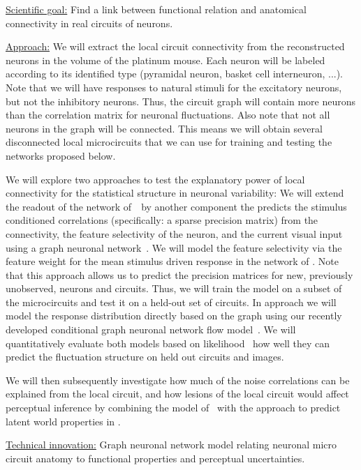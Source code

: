\documentclass[COG,11pt]{ercgrant}
\begin{document}
\underline{Scientific goal:} Find a link between functional relation and anatomical connectivity in real circuits of neurons. 

\underline{Approach:} We will extract the local circuit connectivity from the reconstructed neurons in the volume of the platinum mouse. Each neuron will be labeled according to its identified type (pyramidal neuron, basket cell interneuron, ...). Note that we will have responses to natural stimuli for the excitatory neurons, but not the inhibitory neurons. Thus, the circuit graph will contain more neurons than the correlation matrix for neuronal fluctuations. Also note that not all neurons in the graph will be connected. This means we will obtain several disconnected local microcircuits that we can use for training and testing the networks proposed below. 

We will explore two approaches to test the explanatory power of local connectivity for the statistical structure in neuronal variability:  We will extend the readout of the network of~\obji~by another component the predicts the stimulus conditioned correlations (specifically: a sparse precision matrix) from the connectivity, the feature selectivity of the neuron, and the current visual input using a graph neuronal network~\parencite[GNN]{Scarselli2009-gy}. We will model the feature selectivity via the feature weight for the mean stimulus driven response in the network of \obji. Note that this approach allows us to predict the precision matrices for new, previously unobserved, neurons and circuits. Thus, we will train the model on a subset of the microcircuits and test it on a held-out set of circuits. In approach  we will model the response distribution directly based on the graph using our recently developed conditional graph neuronal network flow model~\parencite{Pierzchlewicz2022-tq}. We will quantitatively evaluate both models based on likelihood~\parencite{Lurz2022-up} how well they can predict the fluctuation structure on held out circuits and images. 

We will then subsequently investigate how much of the noise correlations can be explained from the local circuit, and how lesions of the local circuit would affect perceptual inference by combining the model of \objiii~with the approach to predict latent world properties in \objii.

\underline{Technical innovation:} Graph neuronal network model relating neuronal micro circuit anatomy to functional properties and perceptual uncertainties.  
\end{document}
